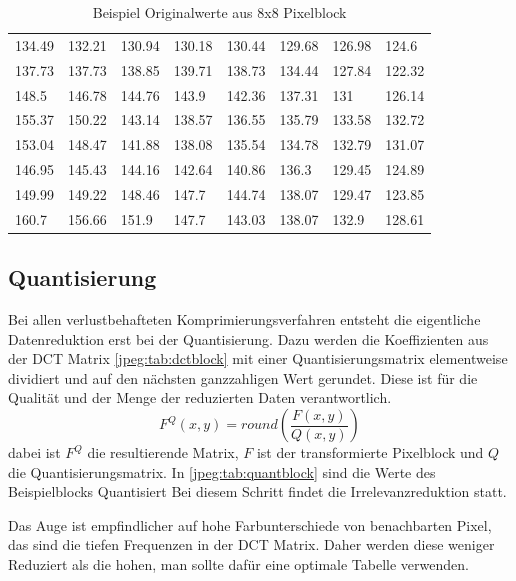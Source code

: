 \begin{table}[b]
    \centering
    \begin{tabular}{llllllll}
        134.49 & 132.21 & 130.94 & 130.18 & 130.44 & 129.68 & 126.98 & 124.6  \\
        137.73 & 137.73 & 138.85 & 139.71 & 138.73 & 134.44 & 127.84 & 122.32 \\
        148.5  & 146.78 & 144.76 & 143.9  & 142.36 & 137.31 & 131    & 126.14 \\
        155.37 & 150.22 & 143.14 & 138.57 & 136.55 & 135.79 & 133.58 & 132.72 \\
        153.04 & 148.47 & 141.88 & 138.08 & 135.54 & 134.78 & 132.79 & 131.07 \\
        146.95 & 145.43 & 144.16 & 142.64 & 140.86 & 136.3  & 129.45 & 124.89 \\
        149.99 & 149.22 & 148.46 & 147.7  & 144.74 & 138.07 & 129.47 & 123.85 \\
        160.7  & 156.66 & 151.9  & 147.7  & 143.03 & 138.07 & 132.9  & 128.61
    \end{tabular}
    \caption{Beispiel Originalwerte aus 8x8 Pixelblock
        \label{jpeg:tab:orgblock}}
\end{table}

\subsection{Quantisierung
\label{jpeg:subsection:quantisierung}}
Bei allen verlustbehafteten Komprimierungsverfahren entsteht die eigentliche Datenreduktion erst bei der Quantisierung.
Dazu werden die Koeffizienten aus der DCT Matrix \ref{jpeg:tab:dctblock} mit einer Quantisierungsmatrix elementweise dividiert und auf den nächsten ganzzahligen Wert gerundet.
Diese ist für die Qualität und der Menge der reduzierten Daten verantwortlich.
\begin{equation}
    F^Q(x,y)
    =
    round \left(
    \frac{F(x,y)}{Q(x,y)}
    \right)
\end{equation}
dabei ist \(F^Q\) die resultierende Matrix, \(F\) ist der transformierte Pixelblock und \(Q\) die Quantisierungsmatrix.
In \ref{jpeg:tab:quantblock} sind die Werte des Beispielblocks Quantisiert
Bei diesem Schritt findet die Irrelevanzreduktion statt.

Das Auge ist empfindlicher auf hohe Farbunterschiede von benachbarten Pixel, das sind die tiefen Frequenzen in der DCT Matrix.
Daher werden diese weniger Reduziert als die hohen, man sollte dafür eine optimale Tabelle verwenden.

